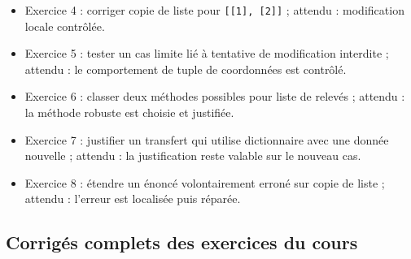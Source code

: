 \begin{itemize}
  pour \texttt{temperature}.
\item
  Exercice 4 : corriger copie de liste pour
  \texttt{{[}{[}1{]},\ {[}2{]}{]}} ; attendu : modification locale
  contrôlée.
\item
  Exercice 5 : tester un cas limite lié à tentative de modification
  interdite ; attendu : le comportement de tuple de coordonnées est
  contrôlé.
\item
  Exercice 6 : classer deux méthodes possibles pour liste de relevés ;
  attendu : la méthode robuste est choisie et justifiée.
\item
  Exercice 7 : justifier un transfert qui utilise dictionnaire avec une
  donnée nouvelle ; attendu : la justification reste valable sur le
  nouveau cas.
\item
  Exercice 8 : étendre un énoncé volontairement erroné sur copie de
  liste ; attendu : l'erreur est localisée puis réparée.
\end{itemize}

\subsection{Corrigés complets des exercices du cours}

